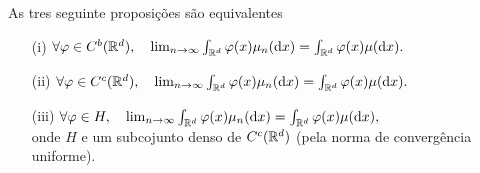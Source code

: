 \begin{proposition}\label{prop:dafunca}
As tres seguinte proposições são equivalentes
\begin{itemize}
 \item [(i)] $\forall \varphi \in C^b({\mathbb R}^d), \quad \lim_{n\to \infty} \int_{{\mathbb R}^d} \varphi(x)\mu_n(\mathrm{d} x)= \int_{{\mathbb R}^d} \varphi(x)\mu(\mathrm{d} x).$
 \item [(ii)] $\forall \varphi \in C^c({\mathbb R}^d), \quad \lim_{n\to \infty} \int_{{\mathbb R}^d} \varphi(x)\mu_n(\mathrm{d} x)= \int_{{\mathbb R}^d} \varphi(x)\mu(\mathrm{d} x).$
  \item [(iii)] $\forall \varphi \in H, \quad \lim_{n\to \infty} \int_{{\mathbb R}^d} \varphi(x)\mu_n(\mathrm{d} x)= \int_{{\mathbb R}^d} \varphi(x)\mu(\mathrm{d} x),$\\
  onde $H$ e um subcojunto denso de $C^c({\mathbb R}^d)$ (pela norma de convergência uniforme).
\end{itemize}

\end{proposition}

